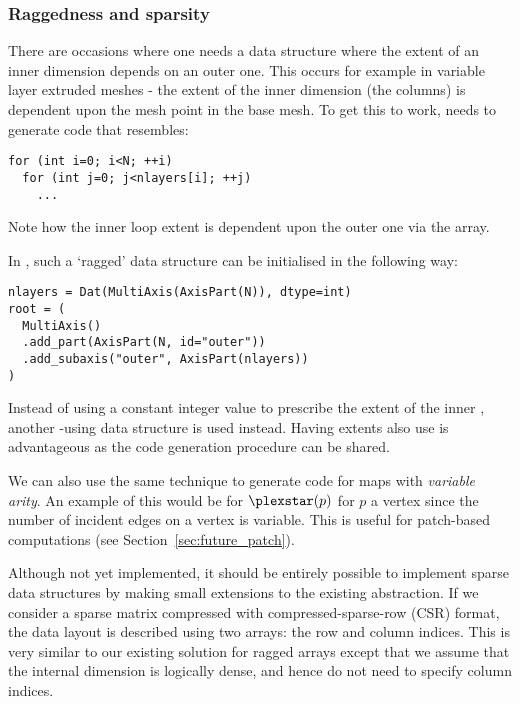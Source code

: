 \subsubsection{Raggedness and sparsity}
\label{sec:impl_datalayout_ragged}

There are occasions where one needs a data structure where the extent of an inner dimension depends on an outer one.
This occurs for example in variable layer extruded meshes - the extent of the inner dimension (the columns) is dependent upon the mesh point in the base mesh.
To get this to work,  needs to generate code that resembles:

\begin{verbatim}
for (int i=0; i<N; ++i)
  for (int j=0; j<nlayers[i]; ++j)
    ...
\end{verbatim}

Note how the inner loop extent is dependent upon the outer one via the  array.

In , such a `ragged' data structure can be initialised in the following way:

\begin{verbatim}
nlayers = Dat(MultiAxis(AxisPart(N)), dtype=int)
root = (
  MultiAxis()
  .add_part(AxisPart(N, id="outer"))
  .add_subaxis("outer", AxisPart(nlayers))
)
\end{verbatim}

Instead of using a constant integer value to prescribe the extent of the inner , another -using data structure is used instead.
Having extents also use  is advantageous as the code generation procedure can be shared.

We can also use the same technique to generate code for maps with \textit{variable arity}.
An example of this would be for $\plexstar(p)$ for $p$ a vertex since the number of incident edges on a vertex is variable.
This is useful for patch-based computations (see Section~\ref{sec:future_patch}).

Although not yet implemented, it should be entirely possible to implement sparse data structures by making small extensions to the existing abstraction.
If we consider a sparse matrix compressed with compressed-sparse-row (CSR) format, the data layout is described using two arrays: the row and column indices.
This is very similar to our existing solution for ragged arrays except that we assume that the internal dimension is logically dense, and hence do not need to specify column indices.

